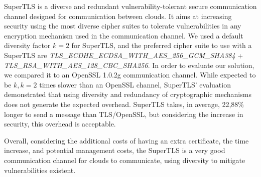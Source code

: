\documentclass{sig-alternate-05-2015}
\begin{document}
SuperTLS is a diverse and redundant vulnerability-tolerant secure communication channel designed for communication between clouds. It aims at increasing security using the most diverse cipher suites to tolerate vulnerabilities in any encryption mechanism used in the communication channel. We used a default diversity factor $k = 2$ for SuperTLS, and the preferred cipher suite to use with a SuperTLS are \textit{TLS\_ECDHE\_ECDSA\_WITH\_AES\_256\_GCM\_SHA384} + \\\textit{TLS\_RSA\_WITH\_AES\_128\_CBC\_SHA256}. In order to evaluate our solution, we compared it to an OpenSSL 1.0.2g communication channel. While expected to be $k, k = 2$ times slower than an OpenSSL channel, SuperTLS' evaluation demonstrated that using diversity and redundancy of cryptographic mechanisms does not generate the expected overhead. SuperTLS takes, in average, 22,88\% longer to send a message than TLS/OpenSSL, but considering the increase in security, this overhead is acceptable.

Overall, considering the additional costs of having an extra certificate, the time increase, and potential management costs, the SuperTLS is a very good communication channel for clouds to communicate, using diversity to mitigate vulnerabilities existent.



%
\end{document}
